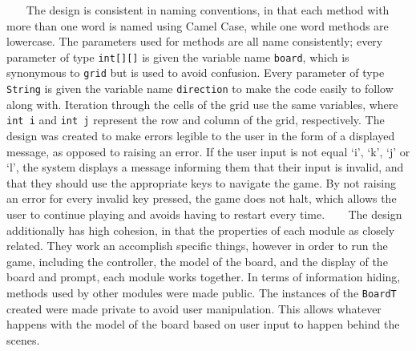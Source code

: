 \documentclass[12pt]{article}
\begin{document}
$~~$$~~$$~~$$~~$The design is consistent in naming conventions, in that each method with more than one word is named using Camel Case, while one word methods are lowercase. The parameters used for methods are all name consistently; every parameter of type \verb|int[][]| is given the variable name \verb|board|, which is synonymous to \verb|grid| but is used to avoid confusion. Every parameter of type \verb|String| is given the variable name \verb|direction| to make the code easily to follow along with. Iteration through the cells of the grid use the same variables, where \verb|int i| and \verb|int j| represent the row and column of the grid, respectively. The design was created to make errors legible to the user in the form of a displayed message, as opposed to raising an error. If the user input is not equal ‘i’, ‘k’, ‘j’ or ‘l’, the system displays a message informing them that their input is invalid, and that they should use the appropriate keys to navigate the game. By not raising an error for every invalid key pressed, the game does not halt, which allows the user to continue playing and avoids having to restart every time. \newline
$~~$$~~$$~~$$~~$The design additionally has high cohesion, in that the properties of each module as closely related. They work an accomplish specific things, however in order to run the game, including the controller, the model of the board, and the display of the board and prompt, each module works together. In terms of information hiding, methods used by other modules were made public. The instances of the \verb|BoardT| created were made private to avoid user manipulation. This allows whatever happens with the model of the board based on user input to happen behind the scenes. 
\end{document}
